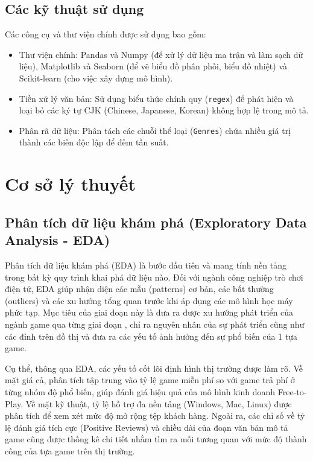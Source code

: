 \subsection{Các kỹ thuật sử dụng}
\hspace{1cm} Các công cụ và thư viện chính được sử dụng bao gồm:
\begin{itemize}
    \item Thư viện chính: Pandas và Numpy (để xử lý dữ liệu ma trận và làm sạch dữ liệu), Matplotlib và Seaborn (để vẽ biểu đồ phân phối, biểu đồ nhiệt) và Scikit-learn (cho việc xây dựng mô hình).
    \item Tiền xử lý văn bản: Sử dụng biểu thức chính quy (\texttt{regex}) để phát hiện và loại bỏ các ký tự CJK (Chinese, Japanese, Korean) không hợp lệ trong mô tả.
    \item Phân rã dữ liệu: Phân tách các chuỗi thể loại (\texttt{Genres}) chứa nhiều giá trị thành các biến độc lập để đếm tần suất.
\end{itemize}







\newpage
\section{Cơ sở lý thuyết}

\subsection{Phân tích dữ liệu khám phá (Exploratory Data Analysis - EDA)}
\hspace{1cm} Phân tích dữ liệu khám phá (EDA) là bước đầu tiên và mang tính nền tảng trong bất kỳ quy trình khai phá dữ liệu nào. Đối với ngành công nghiệp trò chơi điện tử, EDA giúp nhận diện các mẫu (patterns) cơ bản, các bất thường (outliers) và các xu hướng tổng quan trước khi áp dụng các mô hình học máy phức tạp. Mục tiêu của giai đoạn này là đưa ra được xu hướng phát triển của ngành game qua từng giai đoạn , chỉ ra nguyên nhân của sự phát triển cũng như các đỉnh trên đồ thị và đưa ra các yếu tố ảnh hưởng đến sự phổ biến của 1 tựa game.

\hspace{1cm} Cụ thể, thông qua EDA, các yếu tố cốt lõi định hình thị trường được làm rõ. Về mặt giá cả, phân tích tập trung vào tỷ lệ game miễn phí so với game trả phí ở từng nhóm độ phổ biến, giúp đánh giá hiệu quả của mô hình kinh doanh Free-to-Play. Về mặt kỹ thuật, tỷ lệ hỗ trợ đa nền tảng (Windows, Mac, Linux) được phân tích để xem xét mức độ mở rộng tệp khách hàng. Ngoài ra, các chỉ số về tỷ lệ đánh giá tích cực (Positive Reviews) và chiều dài của đoạn văn bản mô tả game cũng được thống kê chi tiết nhằm tìm ra mối tương quan với mức độ thành công của tựa game trên thị trường.

